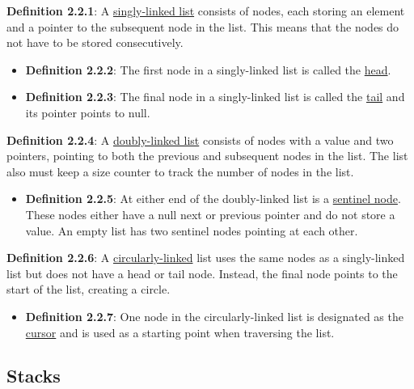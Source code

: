 \documentclass{article}
\newcommand{\separate}[1] {\vspace{#1 pt}\noindent}
\newcommand{\definition}[2]{\textbf{Definition #1}: #2\label{def:#1}}
\begin{document}
\separate{5}\definition{2.2.1}{A \underline{singly-linked list} consists of nodes, each storing an element and a pointer to the subsequent node in the list. This means that the nodes do not have to be stored consecutively.}
\begin{itemize}
    \item \definition{2.2.2}{The first node in a singly-linked list is called the \underline{head}.}
    \item \definition{2.2.3}{The final node in a singly-linked list is called the \underline{tail} and its pointer points to null.}
\end{itemize}
\definition{2.2.4}{A \underline{doubly-linked list} consists of nodes with a value and two pointers, pointing to both the previous and subsequent nodes in the list. The list also must keep a size counter to track the number of nodes in the list.}
\begin{itemize}
    \item \definition{2.2.5}{At either end of the doubly-linked list is a \underline{sentinel node}. These nodes either have a null next or previous pointer and do not store a value. An empty list has two sentinel nodes pointing at each other.}
\end{itemize}
\definition{2.2.6}{A \underline{circularly-linked} list uses the same nodes as a singly-linked list but does not have a head or tail node. Instead, the final node points to the start of the list, creating a circle.}
\begin{itemize}
    \item \definition{2.2.7}{One node in the circularly-linked list is designated as the \underline{cursor} and is used as a starting point when traversing the list.}
\end{itemize}

\subsection{Stacks}
\end{document}
